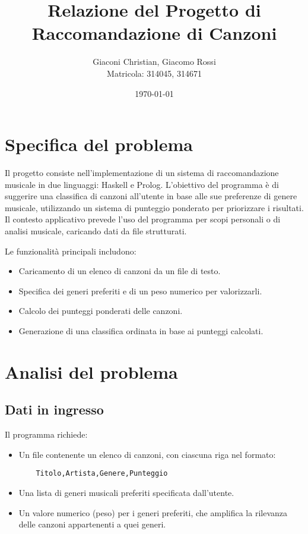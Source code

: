 \documentclass[a4paper,11pt]{article}
\title{\textbf{Relazione del Progetto di Raccomandazione di Canzoni}}
\author{Giaconi Christian, Giacomo Rossi\\Matricola: 314045, 314671}
\date{\today}
\begin{document}
\maketitle

\section{Specifica del problema}
Il progetto consiste nell'implementazione di un sistema di raccomandazione musicale in due linguaggi: Haskell e Prolog. L'obiettivo del programma è di suggerire una classifica di canzoni all'utente in base alle sue preferenze di genere musicale, utilizzando un sistema di punteggio ponderato per priorizzare i risultati. Il contesto applicativo prevede l'uso del programma per scopi personali o di analisi musicale, caricando dati da file strutturati.

Le funzionalità principali includono:
\begin{itemize}
    \item Caricamento di un elenco di canzoni da un file di testo.
    \item Specifica dei generi preferiti e di un peso numerico per valorizzarli.
    \item Calcolo dei punteggi ponderati delle canzoni.
    \item Generazione di una classifica ordinata in base ai punteggi calcolati.
\end{itemize}

\section{Analisi del problema}

\subsection{Dati in ingresso}
Il programma richiede:
\begin{itemize}
    \item Un file contenente un elenco di canzoni, con ciascuna riga nel formato:
    \begin{verbatim}
    Titolo,Artista,Genere,Punteggio
    \end{verbatim}
    \item Una lista di generi musicali preferiti specificata dall'utente.
    \item Un valore numerico (peso) per i generi preferiti, che amplifica la rilevanza delle canzoni appartenenti a quei generi.
\end{itemize}
\end{document}
